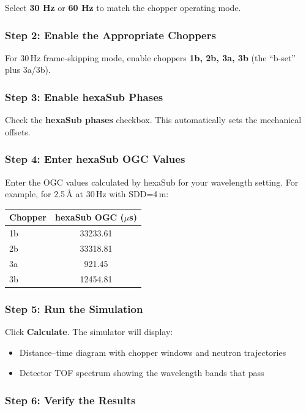 \documentclass[11pt,letterpaper]{article}
\begin{document}
Select \textbf{30 Hz} or \textbf{60 Hz} to match the chopper operating mode.

\subsubsection{Step 2: Enable the Appropriate Choppers}

For 30\,Hz frame-skipping mode, enable choppers \textbf{1b, 2b, 3a, 3b} (the ``b-set'' plus 3a/3b).

\subsubsection{Step 3: Enable hexaSub Phases}

Check the \textbf{hexaSub phases} checkbox. This automatically sets the mechanical offsets.

\subsubsection{Step 4: Enter hexaSub OGC Values}

Enter the OGC values calculated by hexaSub for your wavelength setting. For example, for 
2.5\,\AA{} at 30\,Hz with SDD=4\,m:

\begin{table}[h]
\centering
\begin{tabular}{lc}
\toprule
Chopper & hexaSub OGC ($\mu$s) \\
\midrule
1b & 33233.61 \\
2b & 33318.81 \\
3a & 921.45 \\
3b & 12454.81 \\
\bottomrule
\end{tabular}
\end{table}

\subsubsection{Step 5: Run the Simulation}

Click \textbf{Calculate}. The simulator will display:
\begin{itemize}
    \item Distance--time diagram with chopper windows and neutron trajectories
    \item Detector TOF spectrum showing the wavelength bands that pass
\end{itemize}

\subsubsection{Step 6: Verify the Results}
\end{document}
